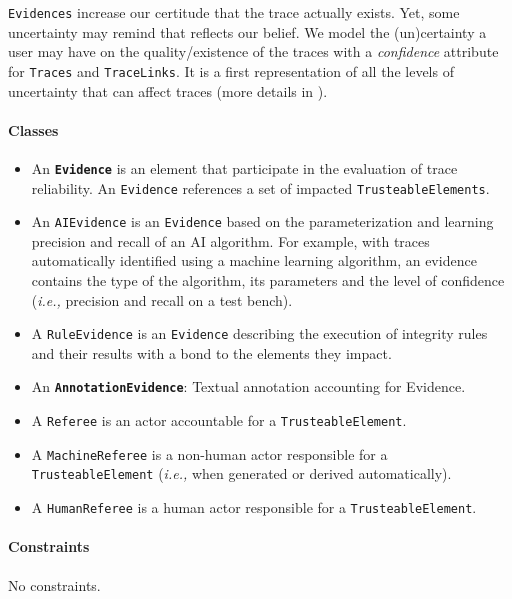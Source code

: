 \texttt{Evidences} increase our certitude that the trace actually exists. Yet, some uncertainty may remind that reflects our belief. We model the (un)certainty a user may have on the quality/existence of the traces with a \textit{confidence} attribute for \texttt{Traces} and \texttt{TraceLinks}. It is a first representation of all the levels of uncertainty that can affect traces (more details in \cite{burgueno2019-uncertainty}).

\paragraph{Classes}
\begin{itemize}
    \item An \textbf{\texttt{Evidence}} is an element that participate in the evaluation of trace reliability. An \texttt{Evidence} references a set of impacted \texttt{TrusteableElements}.
    \item An \texttt{AIEvidence} is an \texttt{Evidence} based on the parameterization and learning precision and recall of an AI algorithm. For example, with traces automatically identified using a machine learning algorithm, an evidence contains the type of the algorithm, its parameters and the level of confidence (\textit{i.e.,} precision and recall on a test bench).
    \item A \texttt{RuleEvidence} is an \texttt{Evidence} describing the execution of integrity rules and their results with a bond to the elements they impact.
    \item An \textbf{\texttt{AnnotationEvidence}}: Textual annotation accounting for Evidence.
    \item A \texttt{Referee} is an actor accountable for a \texttt{TrusteableElement}.
    \item A \texttt{MachineReferee} is a non-human actor responsible for a \texttt{TrusteableElement} (\textit{i.e., } when generated or derived automatically).
    \item A \texttt{HumanReferee}  is a  human actor responsible for a \texttt{TrusteableElement}.
\end{itemize}

\paragraph{Constraints}
No constraints.

